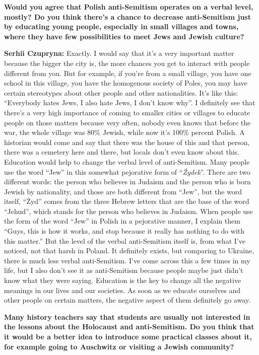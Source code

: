 \textbf{Would you agree that Polish anti-Semitism operates on a verbal level, mostly? Do you think there’s a chance to decrease anti-Semitism just by educating young people, especially in small villages and towns, where they have few possibilities to meet Jews and Jewish culture?} \par
\textbf{Serhii Czupryna:} Exactly. I would say that it’s a very important matter because the bigger the city is, the more chances you get to interact with people different from you. But for example, if you’re from a small village, you have one school in this village, you have the homogenous society of Poles, you may have certain stereotypes about other people and other nationalities. It’s like this: ``Everybody hates Jews, I also hate Jews, I don’t know why''. I definitely see that there’s a very high importance of coming to smaller cities or villages to educate people on those matters because very often, nobody even knows that before the war, the whole village was 80\% Jewish, while now it’s 100\% percent Polish. A historian would come and say that there was the house of this and that person, there was a cemetery here and there, but locals don’t even know about this.\\
Education would help to change the verbal level of anti-Semitism. Many people use the word ``Jew'' in this somewhat pejorative form of ``\textit{Żydek}''. There are two different words: the person who believes in Judaism and the person who is born Jewish by nationality, and those are both different from ``Jew'', but the word itself, ``Żyd'' comes from the three Hebrew letters that are the base of the word ``Jehud'', which stands for the person who believes in Judaism. When people use the form of the word ``Jew'' in Polish in a pejorative manner, I explain them ``Guys, this is how it works, and stop because it really has nothing to do with this matter.'' But the level of the verbal anti-Semitism itself is, from what I’ve noticed, not that harsh in Poland. It definitely exists, but comparing to Ukraine, there is much less verbal anti-Semitism. I’ve come across this a few times in my life, but I also don’t see it as anti-Semitism because people maybe just didn’t know what they were saying. Education is the key to change all the negative meanings in our lives and our societies. As soon as we educate ourselves and other people on certain matters, the negative aspect of them definitely go away.\par 
\textbf{Many history teachers say that students are usually not interested in the lessons about the Holocaust and anti-Semitism. Do you think that it would be a better idea to introduce some practical classes about it, for example going to Auschwitz or visiting a Jewish community?}\par

